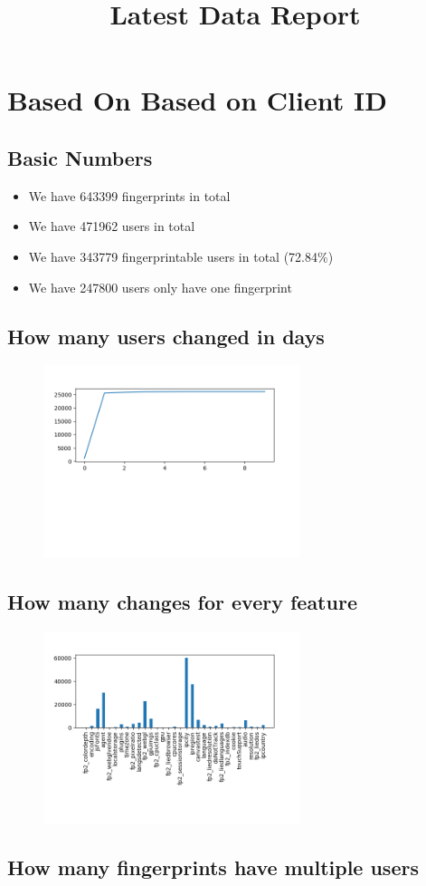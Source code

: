 \documentclass[10pt, conference, compsocconf]{IEEEtran}
\begin{document}
\title{Latest Data Report}
\author{
}
\maketitle
\section{Based On Based on Client ID}
\subsection{Basic Numbers}
\begin{itemize}\item We have 643399 fingerprints in total\item We have 471962 users in total\item We have 343779 fingerprintable users in total (72.84\%)\item We have 247800 users only have one fingerprint \end{itemize}\subsection{How many users changed in days}
\begin{figure}[H]\centering\includegraphics[width=75mm,scale=0.5]{BasedonClientIDchangebytime}\end{figure}\subsection{How many changes for every feature}
\begin{figure}[H]\centering\includegraphics[width=75mm,scale=0.5]{BasedonClientIDfeaturechange}\end{figure}\subsection{How many fingerprints have multiple users}
\end{document}
